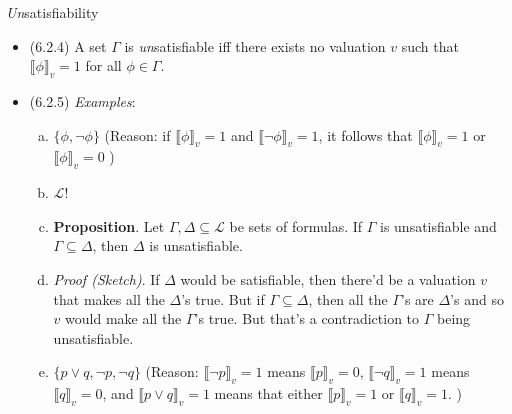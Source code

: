 \documentclass[../slides.tex]{subfiles}
\begin{document}
\begin{frame}{\emph{Un}satisfiability}
	
	\begin{itemize}

		\item (6.2.4) A set $\Gamma$ is \emph{un}satisfiable iff there exists no valuation $v$ such that $\llbracket\phi\rrbracket_v=1$ for all $\phi\in\Gamma$.
		
		\item (6.2.5) \emph{Examples}:
		
			\begin{enumerate}[(a)]
			
				\item $\{\phi,\neg\phi\}$ (Reason: if $\llbracket\phi\rrbracket_v=1$ and $\llbracket\neg \phi\rrbracket_v=1$, it follows that $\llbracket\phi\rrbracket_v=1$ or $\llbracket\phi\rrbracket_v=0$ \lightning)
				
				\item $\mathcal{L}$!
				
				\item \textbf{Proposition}. Let $\Gamma,\Delta\subseteq\mathcal{L}$ be sets of formulas. If $\Gamma$ is unsatisfiable and $\Gamma\subseteq \Delta$, then $\Delta$ is unsatisfiable.
				
				\item[] \emph{Proof (Sketch)}. If $\Delta$ would be satisfiable, then there'd be a valuation $v$ that makes all the $\Delta$'s true. But if $\Gamma\subseteq\Delta$, then all the $\Gamma$'s are $\Delta$'s and so $v$ would make all the $\Gamma$'s true. But that's a contradiction to $\Gamma$ being unsatisfiable.
				
				\item $\{p\lor q, \neg p, \neg q\}$ (Reason: $\llbracket\neg p\rrbracket_v=1$ means $\llbracket p\rrbracket_v=0$, $\llbracket\neg q\rrbracket_v=1$ means $\llbracket q\rrbracket_v=0$, and $\llbracket p\lor q\rrbracket_v=1$ means that either $\llbracket p\rrbracket_v=1$ or $\llbracket q\rrbracket_v=1$. \lightning)
			
			\end{enumerate}
	
	\end{itemize}

\end{frame}
\end{document}
